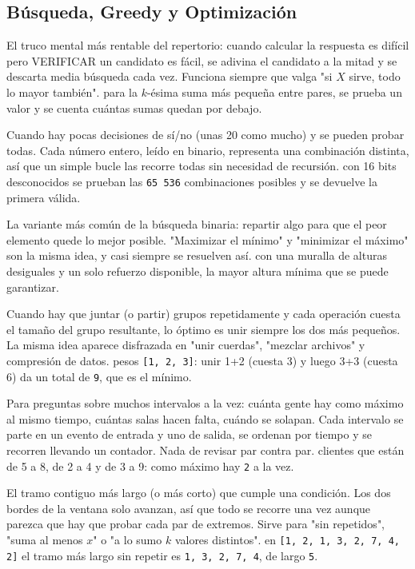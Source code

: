 \subsection*{Búsqueda, Greedy y Optimización}

El truco mental más rentable del repertorio: cuando calcular la respuesta es
difícil pero VERIFICAR un candidato es fácil, se adivina el candidato a la mitad y
se descarta media búsqueda cada vez. Funciona siempre que valga "si $X$ sirve,
todo lo mayor también".
\ej para la $k$-ésima suma más pequeña entre pares, se prueba un valor y se cuenta
cuántas sumas quedan por debajo.

Cuando hay pocas decisiones de sí/no (unas 20 como mucho) y se pueden probar todas.
Cada número entero, leído en binario, representa una combinación distinta, así que
un simple bucle las recorre todas sin necesidad de recursión.
\ej con 16 bits desconocidos se prueban las \texttt{65\,536} combinaciones
posibles y se devuelve la primera válida.

La variante más común de la búsqueda binaria: repartir algo para que el peor
elemento quede lo mejor posible. "Maximizar el mínimo" y "minimizar el máximo" son
la misma idea, y casi siempre se resuelven así.
\ej con una muralla de alturas desiguales y un solo refuerzo disponible, la mayor
altura mínima que se puede garantizar.

Cuando hay que juntar (o partir) grupos repetidamente y cada operación cuesta el
tamaño del grupo resultante, lo óptimo es unir siempre los dos más pequeños. La
misma idea aparece disfrazada en "unir cuerdas", "mezclar archivos" y compresión de
datos.
\ej pesos \texttt{[1, 2, 3]}: unir 1+2 (cuesta 3) y luego 3+3 (cuesta 6) da un
total de \texttt{9}, que es el mínimo.

Para preguntas sobre muchos intervalos a la vez: cuánta gente hay como máximo al
mismo tiempo, cuántas salas hacen falta, cuándo se solapan. Cada intervalo se
parte en un evento de entrada y uno de salida, se ordenan por tiempo y se recorren
llevando un contador. Nada de revisar par contra par.
\ej clientes que están de 5 a 8, de 2 a 4 y de 3 a 9: como máximo hay
\texttt{2} a la vez.

El tramo contiguo más largo (o más corto) que cumple una condición. Los dos bordes
de la ventana solo avanzan, así que todo se recorre una vez aunque parezca que hay
que probar cada par de extremos. Sirve para "sin repetidos", "suma al menos $x$" o
"a lo sumo $k$ valores distintos".
\ej en \texttt{[1, 2, 1, 3, 2, 7, 4, 2]} el tramo más largo sin repetir es
\texttt{1, 3, 2, 7, 4}, de largo \texttt{5}.

